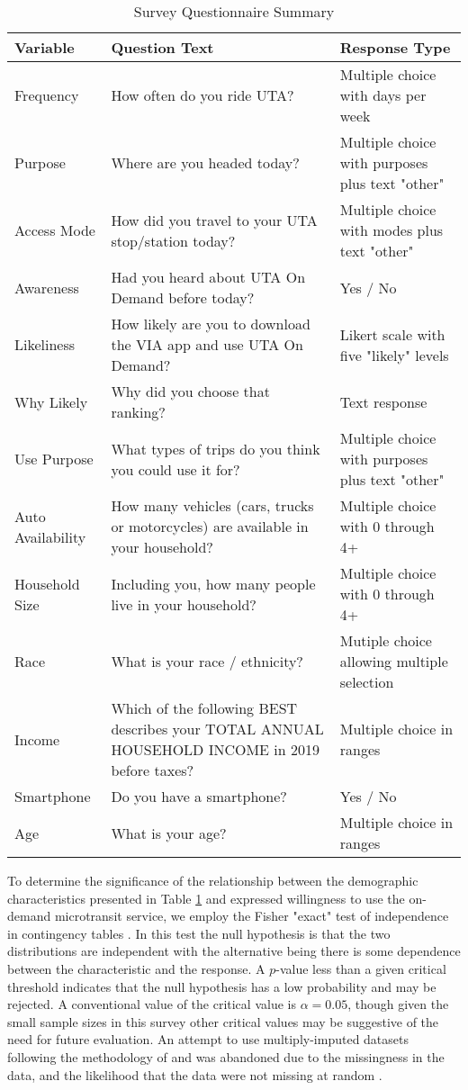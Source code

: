 \documentclass[smartcities,article,submit,moreauthors,pdftex]{Definitions/mdpi}
\begin{document}
\begin{table}[ht]
\renewcommand{\arraystretch}{1.5}
    \centering
    \caption{Survey Questionnaire Summary}
    \label{tab:survey-summary}
\begin{tabular}[t]{lp{}p{}}
\toprule
Variable & Question Text & Response Type\\
\midrule
Frequency & How often do you ride UTA? & Multiple choice with days per week\\
Purpose & Where are you headed today? & Multiple choice with purposes plus text "other"\\
Access Mode & How did you travel to your UTA stop/station today? & Multiple choice with modes plus text "other"\\
Awareness & Had you heard about UTA On Demand before today? & Yes / No\\
Likeliness & How likely are you to download the VIA app and use UTA On Demand? & Likert scale with five "likely" levels\\
\addlinespace
Why Likely & Why did you choose that ranking? & Text response\\
Use Purpose & What types of trips do you think you could use it for? & Multiple choice with purposes plus text "other"\\
Auto Availability & How many vehicles (cars, trucks or motorcycles) are available in your household? & Multiple choice with 0 through 4+\\
Household Size & Including you, how many people live in your household? & Multiple choice with 0 through 4+\\
Race & What is your race / ethnicity? & Mutiple choice allowing multiple selection\\
\addlinespace
Income & Which of the following BEST describes your TOTAL ANNUAL HOUSEHOLD INCOME in 2019 before taxes? & Multiple choice in ranges\\
Smartphone & Do you have a smartphone? & Yes / No\\
Age & What is your age? & Multiple choice in ranges\\
\bottomrule
\end{tabular}
\end{table}

To determine the significance of the relationship between the demographic characteristics presented in Table \ref{tab:survey-summary} and expressed willingness to use the on-demand microtransit service, we employ the Fisher "exact" test of independence in contingency tables \citep{fisherExact}.  In this test the null hypothesis is that the two distributions are independent with the alternative being there is some dependence between the characteristic and the response. A \(p\)-value less than a given critical threshold indicates that the null hypothesis has a low probability and may be rejected. A conventional value of the critical value is \(\alpha=0.05\), though given the small sample sizes in this survey other critical values may be suggestive of the need for future evaluation. An attempt to use multiply-imputed datasets following the methodology of \citet{mice2011} and \citet{LichtThesis} was abandoned due to the missingness in the data, and the likelihood that the data were not missing at random \citep{jakobsen2017}.
\end{document}
